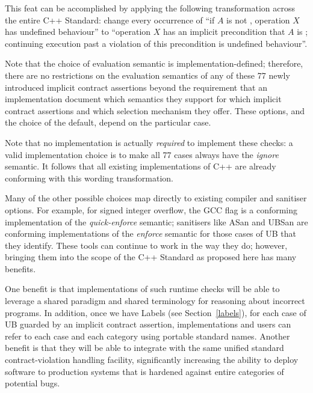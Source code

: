 {This feat can be accomplished by applying the following transformation across the entire C++ Standard: change every occurrence of “if $A$ is not , operation $X$ has undefined behaviour'' to ``operation $X$ has an implicit precondition that $A$ is ; continuing execution past a violation of this precondition is undefined behaviour''.

Note that the choice of evaluation semantic is implementation-defined; therefore, there are no restrictions on the evaluation semantics of any of these 77 newly introduced  implicit contract assertions beyond the requirement that an implementation document which semantics they support for which implicit contract assertions and which selection mechanism they offer. These options, and the choice of the default, depend on the particular case. 

Note that no implementation is actually \emph{required} to implement these checks: a valid implementation choice is to make all 77 cases always have the \emph{ignore} semantic. It follows that all existing implementations of C++ are already conforming with this wording transformation. 

Many of the other possible choices map directly to existing compiler and sanitiser options. For example, for signed integer overflow, the GCC flag  is a conforming implementation of the \emph{quick-enforce} semantic; sanitisers like ASan and UBSan are conforming implementations of the \emph{enforce} semantic for those cases of UB that they identify. These tools can continue to work in the way they do; however, bringing them into the scope of the C++ Standard as proposed here has many benefits.

One benefit is that implementations of such runtime checks will be able to leverage a shared paradigm and shared terminology for reasoning about incorrect programs. In addition, once we have Labels (see Section~\ref{labels}), for each case of UB guarded by an implicit contract assertion, implementations and users can refer to each case and each category using portable standard names.  Another benefit is that they will be able to integrate with the same unified standard contract-violation handling facility, significantly increasing the ability to deploy software to production systems that is hardened against entire categories of potential bugs. 

}
